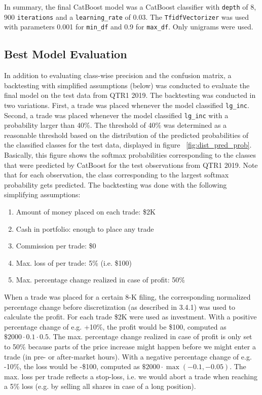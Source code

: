 \documentclass{article}
\begin{document}
	In summary, the final CatBoost model was a CatBoost classifier with \lstinline{depth} of 8, 900 \lstinline{iterations} and a \lstinline{learning_rate} of 0.03. The \lstinline{TfidfVectorizer} was used with parameters 0.001 for \lstinline{min_df} and 0.9 for \lstinline{max_df}. Only unigrams were used.
	

	\subsection{Best Model Evaluation}
	
	In addition to evaluating class-wise precision and the confusion matrix, a backtesting with simplified assumptions (below) was conducted to evaluate the final model on the test data from QTR1 2019. The backtesting was conducted in two variations. First, a trade was placed whenever the model classified \lstinline{lg_inc}. Second, a trade was placed whenever the model classified \lstinline{lg_inc} with a probability larger than 40\%. The threshold of 40\% was determined as a reasonable threshold based on the distribution of the predicted probabilities of the classified classes for the test data, displayed in figure ~\ref{fig:dist_pred_prob}. Basically, this figure shows the softmax probabilities corresponding to the classes that were predicted by CatBoost for the test observations from QTR1 2019. Note that for each observation, the class corresponding to the largest softmax probability gets predicted. The backtesting was done with the following simplifying assumptions:
	
	\begin{enumerate}
		\item 	Amount of money placed on each trade: \$2K
		\item 	Cash in portfolio: enough to place any trade
		\item 	Commission per trade: \$0
		\item 	Max. loss of per trade: 5\% (i.e. \$100)
		\item 	Max. percentage change realized in case of profit: 50\%
	\end{enumerate}
	
	When a trade was placed for a certain 8-K filing, the corresponding normalized percentage change before discretization (as described in 3.4.1) was used to calculate the profit. For each trade \$2K were used as investment. With a positive percentage change of e.g. +10\%, the profit would be \$100, computed as $\$2000\cdot0.1\cdot0.5$. The max. percentage change realized in case of profit is only set to 50\% because parts of the price increase might happen before we might enter a trade (in pre- or after-market hours). With a negative percentage change of e.g. -10\%, the loss would be -\$100, computed as $\$2000\cdot \max(-0.1, -0.05)$. The max. loss per trade reflects a stop-loss, i.e. we would abort a trade when reaching a 5\% loss (e.g. by selling all shares in case of a long position). 
	
\end{document}
